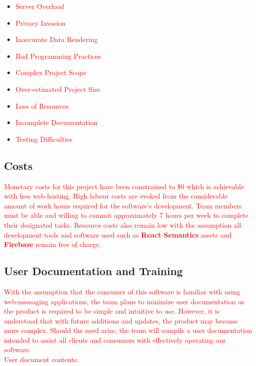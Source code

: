 \documentclass[12pt, titlepage]{article}
\begin{document}
{    	\begin{itemize}
    		\item \textcolor{red}{Server Overload}
    		\item \textcolor{red}{Privacy Invasion}
    		\item \textcolor{red}{Inaccurate Data Rendering}
    		\item \textcolor{red}{Bad Programming Practices}
    		\item \textcolor{red}{Complex Project Scope}
    		\item \textcolor{red}{Over-estimated Project Size}
    		\item \textcolor{red}{Loss of Resources}
    		\item \textcolor{red}{Incomplete Documentation}
    		\item \textcolor{red}{Testing Difficulties}
    	\end{itemize}

    	\subsection{Costs}
    \textcolor{red}{Monetary costs for this project have been constrained to \$0 which is achievable with free web-hosting. High labour costs are evoked from the considerable amount of work hours required for the software's development. Team members must be able and willing to commit approximately 7 hours per week to complete their designated tasks. Resource costs also remain low with the assumption all development tools and software used such as \textbf{React Semantics} assets and \textbf{Firebase} remain free of charge.}
    	
    	\subsection{User Documentation and Training}
    	\textcolor{red}{With the assumption that the consumer of this software is familiar with using web-messaging applications, the team plans to minimize user documentation as the product is required to be simple and intuitive to use. However, it is understood that with future additions and updates, the product may become more complex. Should the need arise, the team will compile a user documentation intended to assist all clients and consumers with effectively operating our software.}\\
    	
    	\textcolor{red}{User document contents:}\\
    	\begin{itemize}
    

\end{itemize}}
\end{document}
